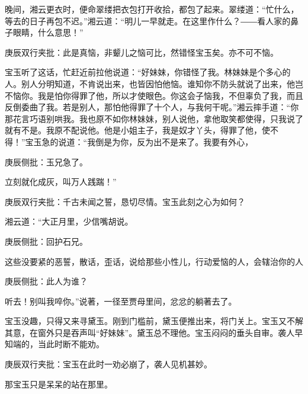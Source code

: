 \begin{parag}
    晚间，湘云更衣时，便命翠缕把衣包打开收拾，都包了起来。翠缕道：“忙什么，等去的日子再包不迟。”湘云道：“明儿一早就走。在这里作什么？――看人家的鼻子眼睛，什么意思！”\begin{note}庚辰双行夹批：此是真恼，非颦儿之恼可比，然错怪宝玉矣。亦不可不恼。\end{note}宝玉听了这话，忙赶近前拉他说道：“好妹妹，你错怪了我。林妹妹是个多心的人。别人分明知道，不肯说出来，也皆因怕他恼。谁知你不防头就说了出来，他岂不恼你。我是怕你得罪了他，所以才使眼色。你这会子恼我，不但辜负了我，而且反倒委曲了我。若是别人，那怕他得罪了十个人，与我何干呢。”湘云摔手道：“你那花言巧语别哄我。我也原不如你林妹妹，别人说他，拿他取笑都使得，只我说了就有不是。我原不配说他。他是小姐主子，我是奴才丫头，得罪了他，使不得！”宝玉急的说道：“我倒是为你，反为出不是来了。我要有外心，\begin{note}庚辰侧批：玉兄急了。\end{note}立刻就化成灰，叫万人践踹！”\begin{note}庚辰双行夹批：千古未闻之誓，恳切尽情。宝玉此刻之心为如何？\end{note}湘云道：“大正月里，少信嘴胡说。\begin{note}庚辰侧批：回护石兄。\end{note}这些没要紧的恶誓，散话，歪话，说给那些小性儿，行动爱恼的人，会辖治你的人\begin{note}庚辰侧批：此人为谁？\end{note}听去！别叫我啐你。”说著，一径至贾母里间，忿忿的躺著去了。
\end{parag}


\begin{parag}
    宝玉没趣，只得又来寻黛玉。刚到门槛前，黛玉便推出来，将门关上。宝玉又不解其意，在窗外只是吞声叫“好妹妹”。黛玉总不理他。宝玉闷闷的垂头自审。袭人早知端的，当此时断不能劝。\begin{note}庚辰双行夹批：宝玉在此时一劝必崩了，袭人见机甚妙。\end{note}那宝玉只是呆呆的站在那里。
\end{parag}


